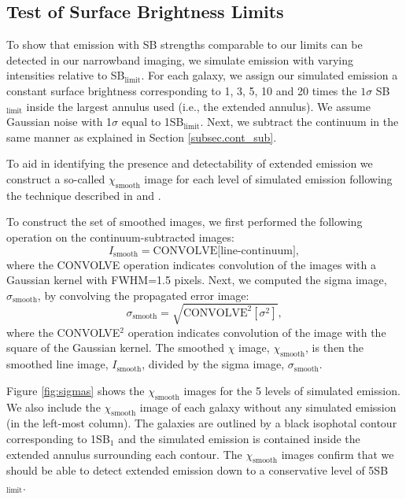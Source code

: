 \documentclass[trackchanges,twocolumn]{aastex62}
\begin{document}
\subsection{Test of Surface Brightness Limits}\label{subsec:test}
To show that  emission with SB strengths comparable to our limits can be detected in our narrowband imaging, we simulate emission with varying intensities relative to SB$_{\text{limit}}$. For each galaxy, we assign our simulated emission a constant surface brightness corresponding to 1, 3, 5, 10 and 20 times the $1\sigma$ SB$_{\text{limit}}$ inside the largest annulus used (i.e., the extended annulus). We assume Gaussian noise with 1$\sigma$ equal to 1SB$_{\text{limit}}$. Next, we subtract the continuum in the same manner as explained in Section \ref{subsec.cont_sub}. 

To aid in identifying the presence and detectability of extended  emission we construct a so-called $\chi_{\text{smooth}}$ image for each level of simulated emission following the technique described in \cite{Hennawi2013} and \cite{Battaia_2015}.

To construct the set of smoothed images, we first performed the following operation on the continuum-subtracted images:
\begin{equation}
I_{\text{smooth}}= \text{CONVOLVE[line-continuum]},
\end{equation}
where the CONVOLVE operation indicates convolution of the  images with a Gaussian kernel with FWHM=1.5 pixels. Next, we computed the sigma image, $\sigma_{\text{smooth}}$, by convolving the propagated error image:
\begin{equation}
\sigma_{\text{smooth}}=\sqrt{\text{CONVOLVE}^2[\sigma^2]},
\end{equation}
where the CONVOLVE$^2$ operation indicates convolution of the image with the square of the Gaussian kernel. The smoothed $\chi$ image, $\chi_{\text{smooth}}$, is then 
the smoothed line image, $I_{\text{smooth}}$, divided by the sigma image, $\sigma_{\text{smooth}}$.

Figure \ref{fig:sigmas} shows the $\chi_{\text{smooth}}$ images for the 5 levels of simulated  emission. We also include the $\chi_{\text{smooth}}$ image of each galaxy without any simulated emission (in the left-most column). The galaxies are outlined by a black isophotal contour corresponding to 1SB$_1$ and the simulated emission is contained inside the extended annulus surrounding each contour. The  $\chi_{\text{smooth}}$ images confirm that we should be able to detect extended  emission down to a conservative level of 5SB$_{\text{limit}}$. 
\end{document}
